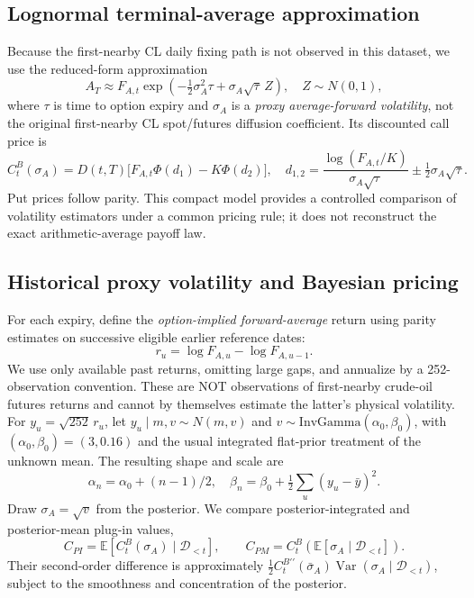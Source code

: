 \documentclass[a4paper,fleqn]{cas-dc}
\begin{document}
\subsection{Lognormal terminal-average approximation}

Because the first-nearby CL daily fixing path is not observed in
this dataset, we use the reduced-form approximation
\begin{equation}
 A_T \approx F_{A,t}
  \exp\!\left(-\tfrac12\sigma_A^2\tau+
  \sigma_A\sqrt{\tau}\,Z\right),\quad Z\sim N(0,1),
\end{equation}
where $\tau$ is time to option expiry and $\sigma_A$ is a
\emph{proxy average-forward volatility}, not the original
first-nearby CL spot/futures diffusion coefficient.
Its discounted call price is
\begin{equation}
 C_t^B(\sigma_A)=D(t,T)
 \bigl[F_{A,t}\Phi(d_1)-K\Phi(d_2)\bigr],\quad
 d_{1,2}=\frac{\log(F_{A,t}/K)}{\sigma_A\sqrt{\tau}}
 \pm \tfrac12\sigma_A\sqrt{\tau}.
\end{equation}
Put prices follow parity. This compact model provides a controlled
comparison of volatility estimators under a common pricing rule;
it does not reconstruct the exact arithmetic-average payoff law.

\subsection{Historical proxy volatility and Bayesian pricing}

For each expiry, define the \emph{option-implied forward-average}
return using parity estimates on successive eligible earlier
reference dates:
\begin{equation}
 r_u=\log F_{A,u}-\log F_{A,u-1}.
\end{equation}
We use only available past returns, omitting large gaps, and
annualize by a 252-observation convention. These are NOT
observations of first-nearby crude-oil futures returns and
cannot by themselves estimate the latter's physical volatility.
For $y_u=\sqrt{252}\,r_u$, let
$y_u\mid m,v\sim N(m,v)$ and
$v\sim\mathrm{InvGamma}(\alpha_0,\beta_0)$, with
$(\alpha_0,\beta_0)=(3,0.16)$ and the usual integrated
flat-prior treatment of the unknown mean. The resulting shape
and scale are
\begin{equation}
 \alpha_n=\alpha_0+(n-1)/2,\quad
 \beta_n=\beta_0+\tfrac12\sum_u(y_u-\bar y)^2.
\end{equation}
Draw $\sigma_A=\sqrt v$ from the posterior. We compare
posterior-integrated and posterior-mean plug-in values,
\begin{equation}
 C_{PI}=\mathbb E[C_t^B(\sigma_A)\mid\mathcal D_{<t}],
 \qquad C_{PM}=C_t^B(\mathbb E[\sigma_A\mid\mathcal D_{<t}]).
\end{equation}
Their second-order difference is approximately
$\tfrac12 C_t^{B\prime\prime}(\bar\sigma_A)
\operatorname{Var}(\sigma_A\mid\mathcal D_{<t})$,
subject to the smoothness and concentration of the posterior.
\end{document}
